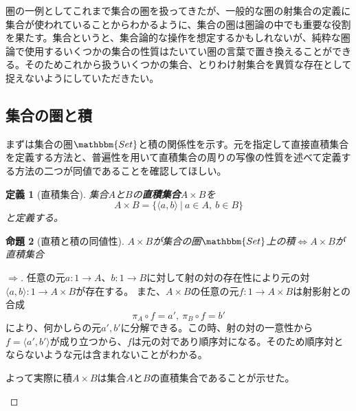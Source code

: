 \documentclass[uplatex,dvipdfmx]{jsarticle}
\newcommand{\cat}[1]{\mathbbm{#1}}
\newcommand{\arrow}{\rightarrow}
\newcommand{\tuple}[1]{\langle #1\rangle}
\newcommand{\mor}[3]{#1:#2\arrow #3}
\newtheorem{proof}{証明}[section]
\newtheorem{prop}[proof]{命題}
\newtheorem{define}[proof]{定義}
\numberwithin{proof}{subsection}
\begin{document}
  圏の一例としてこれまで集合の圏を扱ってきたが、一般的な圏の射集合の定義に集合が使われていることからわかるように、集合の圏は圏論の中でも重要な役割を果たす。集合というと、集合論的な操作を想定するかもしれないが、純粋な圏論で使用するいくつかの集合の性質はたいてい圏の言葉で置き換えることができる。そのためこれから扱ういくつかの集合、とりわけ射集合を異質な存在として捉えないようにしていただきたい。

  \subsection{集合の圏と積}
	まずは集合の圏$\cat{Set}$と積の関係性を示す。元を指定して直接直積集合を定義する方法と、普遍性を用いて直積集合の周りの写像の性質を述べて定義する方法の二つが同値であることを確認してほしい。
	\begin{define}[直積集合]
		集合$A$と$B$の\textbf{直積集合}$A\times B$を\[A\times B =\{\tuple{a,b}\ |\ a\in A,\ b\in B\}\]と定義する。
	\end{define}
	\begin{prop}[直積と積の同値性]
    $A\times B$が集合の圏$\cat{Set}$上の積$\iff A\times B$が直積集合
	\end{prop}
	\begin{proof}[$\Longrightarrow$]
		任意の元$\mor{a}{1}{A}$、$\mor{b}{1}{B}$に対して射の対の存在性により元の対$\mor{\tuple{a,b}}{1}{A\times B}$が存在する。
		また、$A\times B$の任意の元$\mor{f}{1}{A\times B}$は射影射との合成\[\pi_A\circ f=a',\ \pi_B\circ f=b'\]により、何かしらの元$a',b'$に分解できる。この時、射の対の一意性から$f=\tuple{a',b'}$が成り立つから、$f$は元の対であり順序対になる。そのため順序対とならないような元は含まれないことがわかる。

		よって実際に積$A\times B$は集合$A$と$B$の直積集合であることが示せた。
		\begin{center}
		\end{center}
	\end{proof}
\end{document}
